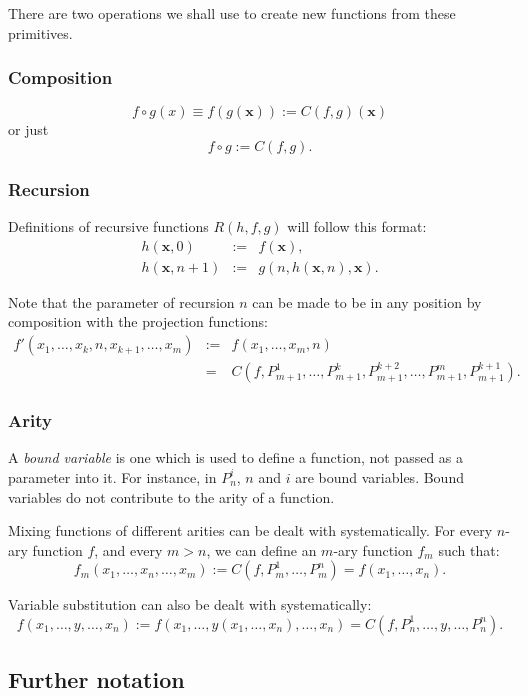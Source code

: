 \documentclass[a4paper]{article}
\newcommand{\xvec}{\mathbf{x}}	%
\theoremstyle{plain}
\theoremstyle{definition}
\begin{document}
There are two operations we shall use to create new functions from these primitives.

\subsubsection{Composition} 
\[f \circ g(x) \equiv f(g(\xvec)) := C(f,g)(\xvec)\] 
or just 
\[f \circ g := C(f,g).\]

\subsubsection{Recursion}
Definitions of recursive functions $R(h,f,g)$ will follow this format:
\begin{eqnarray*}
	h(\xvec,0) & := & f(\xvec), \\
	h(\xvec,n+1) & := & g(n,h(\xvec,n),\xvec).
\end{eqnarray*} 

Note that the parameter of recursion $n$ can be made to be in any position by composition with the projection functions:
\begin{eqnarray*}
 f'(x_1, \dots, x_k, n, x_{k+1}, \dots, x_m) &:=& f(x_1, \dots, x_m, n) \\
 &=& C(f, P_{m+1}^1, \dots, P_{m+1}^k, P_{m+1}^{k+2},\dots, P_{m+1}^m, P_{m+1}^{k+1}).
 \end{eqnarray*}

\subsubsection{Arity}
A \textit{bound variable} is one which is used to define a function, not passed as a parameter into it. For instance, in $P_n^i$, $n$ and $i$ are bound variables. Bound variables do not contribute to the arity of a function.

Mixing functions of different arities can be dealt with systematically. For every $n$-ary function $f$, and every $m > n$, we can define an $m$-ary function $f_m$ such that:
\[f_m(x_1, \dots, x_n, \dots, x_m) := C(f,P_m^1, \dots, P_m^n) = f(x_1, \dots, x_n).\]

Variable substitution can also be dealt with systematically:
\[f(x_1, \dots, y, \dots, x_n) := f(x_1, \dots, y(x_1, \dots, x_n), \dots, x_n) = C(f,P_n^1, \dots, y, \dots, P_n^n). \]

\subsection{Further notation}
\end{document}
